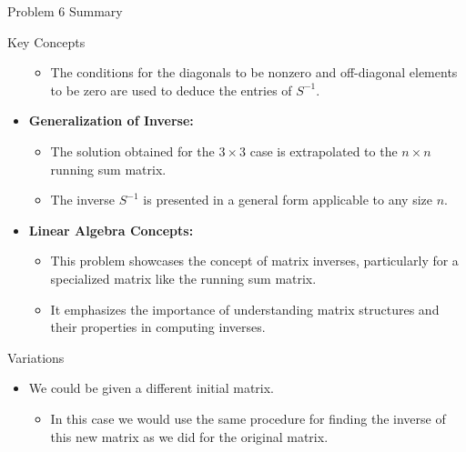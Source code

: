 \begin{summary}{Problem 6 Summary}
\begin{statement}{Key Concepts}
\begin{itemize}
\begin{itemize}
                \item The conditions for the diagonals to be nonzero and off-diagonal elements to be zero are used to deduce the entries of $S^{-1}$.
            \end{itemize}
            \item \textbf{Generalization of Inverse:}
            \begin{itemize}
                \item The solution obtained for the $3 \times 3$ case is extrapolated to the $n \times n$ running sum matrix.
                \item The inverse $S^{-1}$ is presented in a general form applicable to any size $n$.
            \end{itemize}
            \item \textbf{Linear Algebra Concepts:}
            \begin{itemize}
                \item This problem showcases the concept of matrix inverses, particularly for a specialized matrix like the running sum matrix.
                \item It emphasizes the importance of understanding matrix structures and their properties in computing inverses.
            \end{itemize}
        \end{itemize}
    \end{statement}
    \begin{statement}{Variations}
        \begin{itemize}
            \item We could be given a different initial matrix.
            \begin{itemize}
                \item In this case we would use the same procedure for finding the inverse of this new matrix as we did for the original matrix.
            \end{itemize}
        \end{itemize}
    \end{statement}
\end{summary}